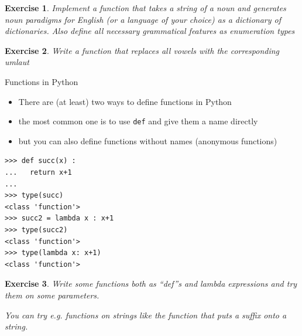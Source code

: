 \documentclass{beamer}
\newtheorem{exercise}{Exercise}
\begin{document}
\begin{frame}
  \begin{exercise}
Implement a function that takes a string of a noun and generates noun paradigms for English (or a language of your choice) as a dictionary of dictionaries. Also define all necessary grammatical features as enumeration types
  \end{exercise}
  \begin{exercise}
    Write a function that replaces all vowels with the corresponding umlaut
  \end{exercise}
\end{frame}
\begin{frame}[fragile]{Functions in Python}
  \begin{itemize}
  \item There are (at least) two ways to define functions in Python
  \item the most common one is to use \texttt{def} and give them a name directly
  \item but you can also define functions without names (anonymous functions)
  \end{itemize}
\begin{verbatim}
>>> def succ(x) :
...   return x+1
... 
>>> type(succ)
<class 'function'>
>>> succ2 = lambda x : x+1
>>> type(succ2)
<class 'function'>
>>> type(lambda x: x+1)
<class 'function'>
\end{verbatim}
\end{frame}

\begin{frame}
  \begin{exercise}
    Write some functions both as ``def''s and lambda expressions and try them on some parameters.

    You can try e.g. functions on strings like the function that puts a suffix onto a string.
  \end{exercise}
\end{frame}
\end{document}

